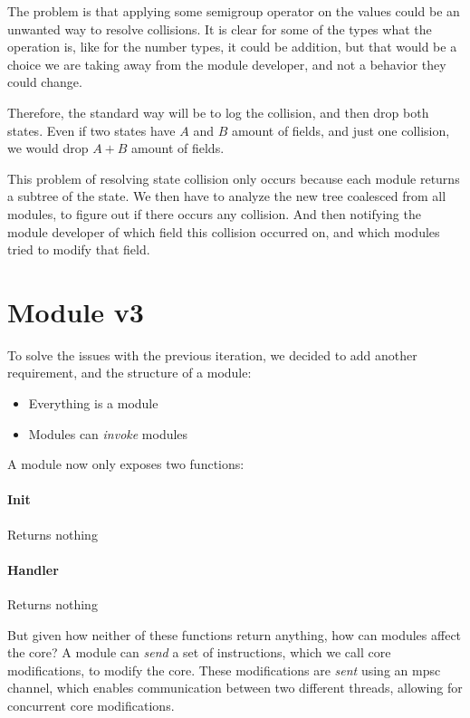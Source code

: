 The problem is that applying some semigroup operator on the values could be an
unwanted way to resolve collisions. It is clear for some of the types what the
operation is, like for the number types, it could be addition, but that would be
a choice we are taking away from the module developer, and not a behavior they
could change.

Therefore, the standard way will be to log the collision, and then drop both
states. Even if two states have $A$ and $B$ amount of fields, and just one
collision, we would drop $A + B$ amount of fields.

This problem of resolving state collision only occurs because each module
returns a subtree of the state. We then have to analyze the new tree coalesced
from all modules, to figure out if there occurs any collision. And then
notifying the module developer of which field this collision occurred on, and
which modules tried to modify that field.


\section{Module v3} \label{sec:moD3}

To solve the issues with the previous iteration, we decided to add another
requirement, and the structure of a module:

\begin{itemize}
  \item Everything is a module
  \item Modules can \textit{invoke} modules
\end{itemize}

A module now only exposes two functions:

\paragraph{Init} Returns nothing

\paragraph{Handler} Returns nothing

But given how neither of these functions return anything, how can modules affect
the core? A module can \textit{send} a set of instructions, which we call core
modifications, to modify the core. These modifications are \textit{sent} using
an \gls*{mpsc} channel, which enables communication between two different
threads, allowing for concurrent core modifications.

